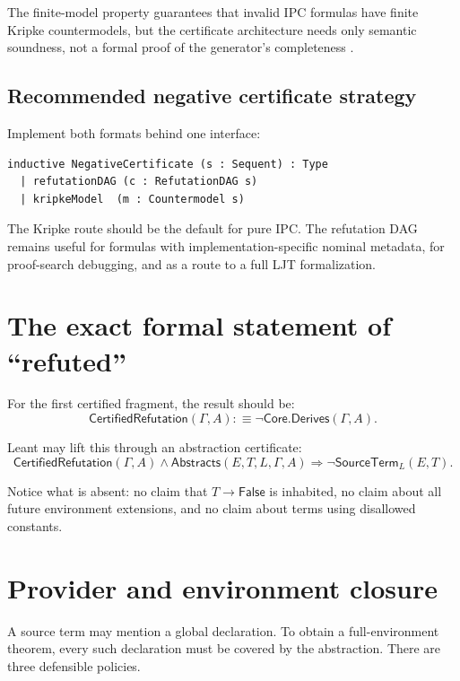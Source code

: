 \documentclass[11pt,letterpaper,openany]{report}
\theoremstyle{definition}
\theoremstyle{remark}
\begin{document}
The finite-model property guarantees that invalid IPC formulas have finite Kripke countermodels, but the certificate architecture needs only semantic soundness, not a formal proof of the generator's completeness \cite{troelstra,sorensen}.

\subsection{Recommended negative certificate strategy}

Implement both formats behind one interface:

\begin{lstlisting}[language=LeanFour,caption={Two independently checkable negative certificate forms.}]
inductive NegativeCertificate (s : Sequent) : Type
  | refutationDAG (c : RefutationDAG s)
  | kripkeModel  (m : Countermodel s)
\end{lstlisting}

The Kripke route should be the default for pure IPC. The refutation DAG remains useful for formulas with implementation-specific nominal metadata, for proof-search debugging, and as a route to a full LJT formalization.

\section{The exact formal statement of ``refuted''}

For the first certified fragment, the result should be:
\[
  \mathsf{CertifiedRefutation}(\Gamma,A)
  :\equiv
  \neg\mathsf{Core.Derives}(\Gamma,A).
\]

Leant may lift this through an abstraction certificate:
\[
  \mathsf{CertifiedRefutation}(\Gamma,A)
  \wedge
  \mathsf{Abstracts}(E,T,L,\Gamma,A)
  \Longrightarrow
  \neg\mathsf{SourceTerm}_L(E,T).
\]

Notice what is absent: no claim that \(T\to\mathsf{False}\) is inhabited, no claim about all future environment extensions, and no claim about terms using disallowed constants.

\section{Provider and environment closure}
\label{sec:provider-closure}

A source term may mention a global declaration. To obtain a full-environment theorem, every such declaration must be covered by the abstraction. There are three defensible policies.
\end{document}

